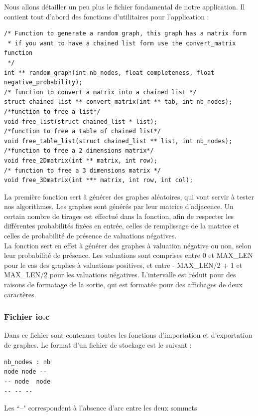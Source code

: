 \documentclass[a4paper,12pt,final] {article}
\begin{document}
Nous allons détailler un peu plus le fichier fondamental de notre application. Il contient tout d'abord des fonctions d'utilitaires pour l'application :
\begin{lstlisting}
/* Function to generate a random graph, this graph has a matrix form
 * if you want to have a chained list form use the convert_matrix function
 */
int ** random_graph(int nb_nodes, float completeness, float negative_probability);
/* function to convert a matrix into a chained list */
struct chained_list ** convert_matrix(int ** tab, int nb_nodes);
/*function to free a list*/
void free_list(struct chained_list * list);
/*function to free a table of chained list*/
void free_table_list(struct chained_list ** list, int nb_nodes);
/*function to free a 2 dimensions matrix*/
void free_2Dmatrix(int ** matrix, int row);
/* function to free a 3 dimensions matrix */
void free_3Dmatrix(int *** matrix, int row, int col);
\end{lstlisting}

La première fonction sert à générer des graphes aléatoires, qui vont servir à tester nos algorithmes. Les graphes sont générés par leur matrice d'adjacence. Un certain nombre de tirages est effectué dans la fonction, afin de respecter les différentes probabilités fixées en entrée, celles de remplissage de la matrice et celles de probabilité de présence de valuations négatives.\\

La fonction sert en effet à générer des graphes à valuation négative ou non, selon leur probabilité de présence. Les valuations sont comprises entre 0 et MAX\_LEN pour le cas des graphes à valuations positives, et entre - MAX\_LEN/2 + 1 et MAX\_LEN/2 pour les valuations négatives. L'intervalle est réduit pour des raisons de formatage de la sortie, qui est formatée pour des affichages de deux caractères.\\

\subsubsection{Fichier io.c}

Dans ce fichier sont contenues toutes les fonctions d'importation et d'exportation de graphes. Le format d'un fichier de stockage est le suivant :
\begin{lstlisting}
nb_nodes : nb
node node --
-- node  node
-- -- --
\end{lstlisting}

Les ``--" correspondent à l'absence d'arc entre les deux sommets.
\end{document}
